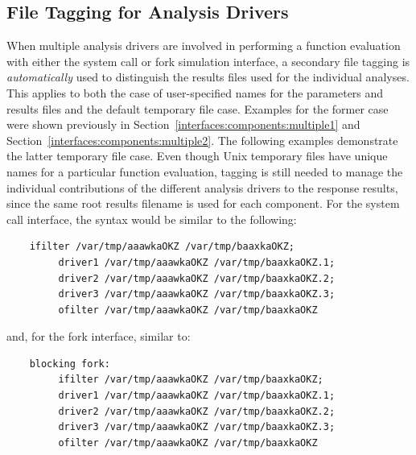 \subsection{File Tagging for Analysis Drivers}\label{interfaces:file:tagging2}

When multiple analysis drivers are involved in performing a function
evaluation with either the system call or fork simulation interface,
a secondary file tagging is \emph{automatically} used to
distinguish the results files used for the individual analyses. This
applies to both the case of user-specified names for the parameters
and results files and the default temporary file case. Examples
for the former case were shown previously in
Section~\ref{interfaces:components:multiple1} and
Section~\ref{interfaces:components:multiple2}.  The following examples
demonstrate the latter temporary file case. Even though Unix
temporary files have unique names for a particular function
evaluation, tagging is still needed to manage the individual
contributions of the different analysis drivers to the response
results, since the same root results filename is used for each
component. For the system call interface, the syntax would be similar
to the following:
\begin{small}
\begin{verbatim}
    ifilter /var/tmp/aaawkaOKZ /var/tmp/baaxkaOKZ;
         driver1 /var/tmp/aaawkaOKZ /var/tmp/baaxkaOKZ.1;
         driver2 /var/tmp/aaawkaOKZ /var/tmp/baaxkaOKZ.2;
         driver3 /var/tmp/aaawkaOKZ /var/tmp/baaxkaOKZ.3;
         ofilter /var/tmp/aaawkaOKZ /var/tmp/baaxkaOKZ
\end{verbatim}
\end{small}

and, for the fork interface, similar to:
\begin{small}
\begin{verbatim}
    blocking fork:
         ifilter /var/tmp/aaawkaOKZ /var/tmp/baaxkaOKZ;
         driver1 /var/tmp/aaawkaOKZ /var/tmp/baaxkaOKZ.1;
         driver2 /var/tmp/aaawkaOKZ /var/tmp/baaxkaOKZ.2;
         driver3 /var/tmp/aaawkaOKZ /var/tmp/baaxkaOKZ.3;
         ofilter /var/tmp/aaawkaOKZ /var/tmp/baaxkaOKZ
\end{verbatim}
\end{small}

